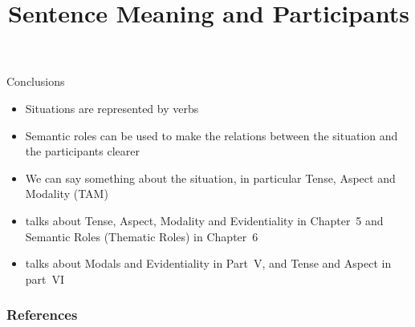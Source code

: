 \documentclass{beamer}
\title[Sentences]{Sentence Meaning and Participants}
\begin{document}
\maketitle


%
%

\begin{frame}{Conclusions}

\begin{itemize}
\item Situations are represented by verbs
\item Semantic roles can be used to make the relations between the situation and the participants clearer
\item We can say something about the situation, in particular Tense, Aspect and Modality (TAM)
\item \citet{Saeed:2015} talks about Tense, Aspect, Modality and Evidentiality in Chapter~5 and Semantic Roles (Thematic Roles) in  Chapter~6
\item  \citet{Kroeger:2022} talks about Modals and Evidentiality in Part~V, and Tense and Aspect in part~VI
\end{itemize}
\end{frame}



\begin{frame}[allowframebreaks]
  \frametitle{References}
  
  
\end{frame}


\end{document}

